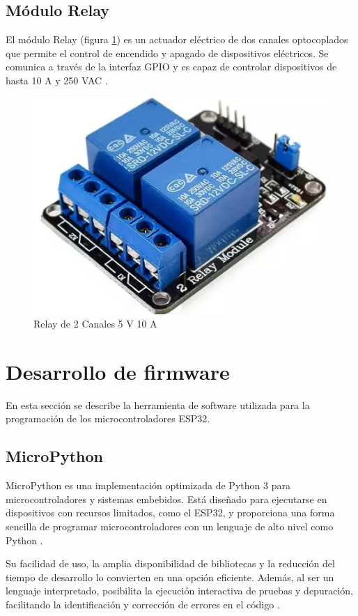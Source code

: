 \subsection{Módulo Relay}

El módulo Relay (figura \ref{fig:Relay}) es un actuador eléctrico de dos
canales optocoplados que permite el control de encendido y apagado de
dispositivos eléctricos. Se comunica a través de la interfaz GPIO y es capaz de
controlar dispositivos de hasta 10 A y 250 VAC \cite{Relay}.

\begin{figure}[H]
	\centering
	\includegraphics[height=.15\textwidth]{./Images/13.png}
	\caption{Relay de 2 Canales 5 V 10 A}
	\label{fig:Relay}
\end{figure}


\section{Desarrollo de firmware}

En esta sección se describe la herramienta de software utilizada para la
programación de los microcontroladores ESP32.

\subsection{MicroPython}

MicroPython es una implementación optimizada de Python 3 para
microcontroladores y sistemas embebidos. Está diseñado para ejecutarse en
dispositivos con recursos limitados, como el ESP32, y proporciona una forma
sencilla de programar microcontroladores con un lenguaje de alto nivel como
Python \cite{MicroPython}.

Su facilidad de uso, la amplia disponibilidad de bibliotecas y la reducción del
tiempo de desarrollo lo convierten en una opción eficiente. Además, al ser un
lenguaje interpretado, posibilita la ejecución interactiva de pruebas y
depuración, facilitando la identificación y corrección de errores en el código
\cite{CTAMicroPython}.


